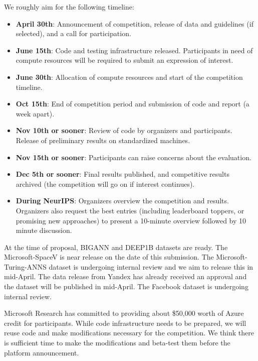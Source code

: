 We roughly aim for the following timeline:
\begin{itemize}
 \item {\bf April 30th}: Announcement of competition, release of data
   and guidelines (if selected), and a call for participation.
 \item {\bf June 15th}: Code and testing infrastructure released.
    Participants in need of compute resources will be required to
    submit an expression of interest.
 \item {\bf June 30th}: Allocation of compute resources and start of
   the competition timeline.
  \item {\bf Oct 15th}: End of competition period and submission of
    code and report (a week apart).
  \item {\bf Nov 10th or sooner}: Review of code by organizers and
    participants. Release of preliminary results on standardized
    machines.
  \item {\bf Nov 15th or sooner}: Participants can raise concerns
    about the evaluation.
  \item {\bf Dec 5th or sooner}: Final results published, and
    competitive results archived (the competition will go on if
    interest continues).
  \item {\bf During NeurIPS}: Organizers overview the competition and
    results. Organizers also request the best entries (including
    leaderboard toppers, or promising new approaches) to present a
    10-minute overview  followed by 10 minute discussion.
\end{itemize}

At the time of proposal, BIGANN and DEEP1B datasets are ready.  The
Microsoft-SpaceV is near release on the date of this submission.  The
Microsoft-Turing-ANNS dataset is undergoing internal review and we aim
to release this in mid-April.  The data release from Yandex has
already received an approval and the dataset will be published in
mid-April.  The Facebook dataset is undergoing internal review.

Microsoft Research has committed to providing about \$50,000 worth of
Azure credit for participants. While code infrastructure needs to be
prepared, we will reuse code \cite{Benchmark} and make modifications
necessary for the competition. We think there is sufficient time to
make the modifications and beta-test them before the platform
announcement.

